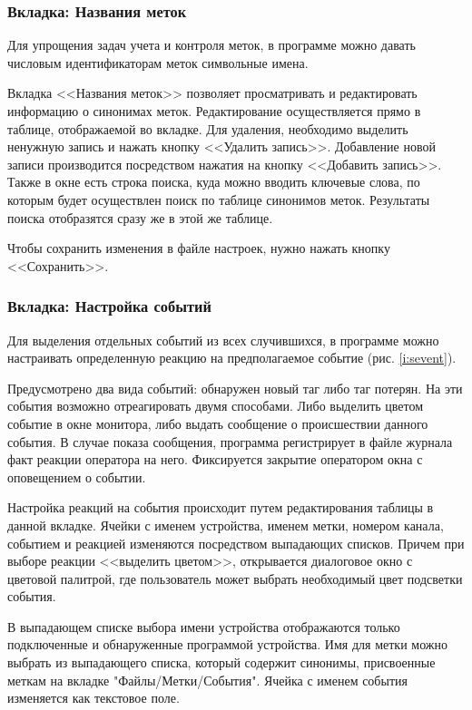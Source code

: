 \subsubsection{Вкладка: Названия меток}

Для упрощения задач учета и контроля меток, в программе можно давать числовым идентификаторам меток
символьные имена. 

Вкладка <<Названия меток>> позволяет просматривать и редактировать информацию о синонимах меток. 
Редактирование осуществляется прямо в таблице, отображаемой во вкладке. Для удаления, необходимо выделить ненужную 
запись и нажать кнопку <<Удалить запись>>. Добавление новой записи производится посредством нажатия на
кнопку <<Добавить запись>>. Также в окне есть строка поиска, куда можно вводить ключевые слова, по которым
будет осуществлен поиск по таблице синонимов меток. Результаты поиска отобразятся сразу же в этой же таблице.

Чтобы сохранить изменения в файле настроек, нужно нажать кнопку <<Сохранить>>.

\subsubsection{Вкладка: Настройка событий}

Для выделения отдельных событий из всех случившихся, в программе можно настраивать определенную реакцию
на предполагаемое событие (рис. \ref{i:sevent}). 

Предусмотрено два вида событий: обнаружен новый таг либо таг потерян. На эти события возможно отреагировать двумя способами.
Либо выделить цветом событие в окне монитора, либо выдать сообщение о происшествии данного события.
В случае показа сообщения, программа регистрирует в файле журнала факт реакции оператора на него. Фиксируется закрытие
оператором окна с оповещением о событии.

Настройка реакций на события происходит путем редактирования таблицы в данной вкладке. Ячейки с именем устройства, именем метки, 
номером канала, событием и реакцией
изменяются посредством выпадающих списков. Причем при выборе реакции <<выделить цветом>>, открывается диалоговое окно с цветовой палитрой, где
пользователь может выбрать необходимый цвет подсветки события. 

В выпадающем списке выбора имени устройства отображаются только подключенные и обнаруженные программой устройства. Имя для метки можно выбрать из
выпадающего списка, который содержит синонимы, присвоенные меткам на вкладке "Файлы/Метки/События".
Ячейка с именем события изменяется как текстовое поле. 

